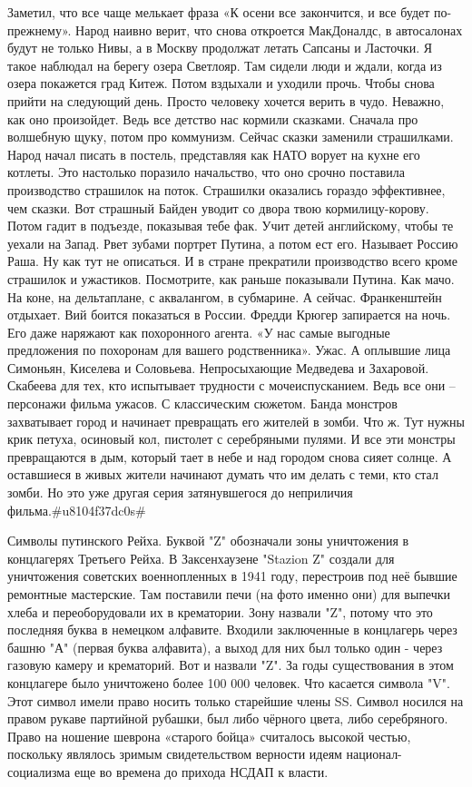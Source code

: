 Заметил, что все чаще мелькает фраза «К осени все закончится, и все будет по-прежнему». Народ наивно верит, что снова откроется МакДоналдс, в автосалонах будут не только Нивы, а в Москву продолжат летать Сапсаны и Ласточки.
Я такое наблюдал на берегу озера Светлояр. Там сидели люди и ждали, когда из озера покажется град Китеж. Потом вздыхали и уходили прочь. Чтобы снова прийти на следующий день. Просто человеку хочется верить в чудо. Неважно, как оно произойдет. Ведь все детство нас кормили сказками. Сначала про волшебную щуку, потом про коммунизм. Сейчас сказки заменили страшилками. Народ начал писать в постель, представляя как НАТО ворует на кухне его котлеты.
Это настолько поразило начальство, что оно срочно поставила производство страшилок на поток. Страшилки оказались гораздо эффективнее, чем сказки. Вот страшный Байден уводит со двора твою кормилицу-корову. Потом гадит в подъезде, показывая тебе фак. Учит детей английскому, чтобы те уехали на Запад. Рвет зубами портрет Путина, а потом ест его. Называет Россию Раша. Ну как тут не описаться.
И в стране прекратили производство всего кроме страшилок и ужастиков. Посмотрите, как раньше показывали Путина. Как мачо. На коне, на дельтаплане, с аквалангом, в субмарине. А сейчас. Франкенштейн отдыхает. Вий боится показаться в России. Фредди Крюгер запирается на ночь. Его даже наряжают как похоронного агента. «У нас самые выгодные предложения по похоронам для вашего родственника». Ужас.
А оплывшие лица Симоньян, Киселева и Соловьева. Непросыхающие Медведева и Захаровой. Скабеева для тех, кто испытывает трудности с мочеиспусканием. Ведь все они – персонажи фильма ужасов.
С классическим сюжетом. Банда монстров захватывает город и начинает превращать его жителей в зомби.
Что ж. Тут нужны крик петуха, осиновый кол, пистолет с серебряными пулями. И все эти монстры превращаются в дым, который тает в небе и над городом снова сияет солнце. А оставшиеся в живых жители начинают думать что им делать с теми, кто стал зомби. Но это уже другая серия затянувшегося до неприличия фильма.#u8104f37dc0s#

Символы путинского Рейха.
Буквой "Z" обозначали зоны уничтожения в концлагерях Третьего Рейха. В Заксенхаузене "Stazion Z" создали для уничтожения советских военнопленных в 1941 году, перестроив под неё бывшие ремонтные мастерские. Там поставили печи (на фото именно они) для выпечки хлеба и переоборудовали их в крематории. Зону назвали "Z", потому что это последняя буква в немецком алфавите. Входили заключенные в концлагерь через башню "А" (первая буква алфавита), а выход для них был только один - через газовую камеру и крематорий. Вот и назвали "Z". За годы существования в этом концлагере было уничтожено более 100 000 человек.
Что касается символа "V". Этот символ имели право носить только старейшие члены SS.
Символ носился на правом рукаве партийной рубашки, был либо чёрного цвета, либо серебряного. Право на ношение шеврона «старого бойца» считалось высокой честью, поскольку являлось зримым свидетельством верности идеям национал-социализма еще во времена до прихода НСДАП к власти.
